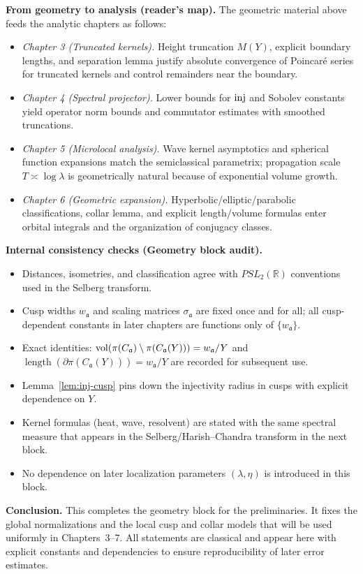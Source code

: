\medskip

\noindent\textbf{From geometry to analysis (reader’s map).}
The geometric material above feeds the analytic chapters as follows:
\begin{itemize}
  \item \emph{Chapter 3 (Truncated kernels).} Height truncation $M(Y)$, explicit boundary lengths, and separation lemma
        justify absolute convergence of Poincaré series for truncated kernels and control remainders near the boundary.
  \item \emph{Chapter 4 (Spectral projector).} Lower bounds for $\operatorname{inj}$ and Sobolev constants yield
        operator norm bounds and commutator estimates with smoothed truncations.
  \item \emph{Chapter 5 (Microlocal analysis).} Wave kernel asymptotics
        and spherical function expansions match the semiclassical parametrix;
        propagation scale $T\asymp \log\lambda$ is geometrically natural because of exponential volume growth.
  \item \emph{Chapter 6 (Geometric expansion).} Hyperbolic/elliptic/parabolic classifications, collar lemma,
        and explicit length/volume formulas enter orbital integrals and the organization of conjugacy classes.
\end{itemize}

\medskip

\noindent\textbf{Internal consistency checks (Geometry block audit).}
\begin{itemize}
  \item Distances, isometries, and classification agree with $PSL_{2}(\mathbb{R})$ conventions used in the Selberg transform.
  \item Cusp widths $w_{\mathfrak{a}}$ and scaling matrices $\sigma_{\mathfrak{a}}$ are fixed once and for all;
        all cusp-dependent constants in later chapters are functions only of $\{w_{\mathfrak{a}}\}$.
  \item Exact identities:
        $\operatorname{vol}(\pi(C_{\mathfrak{a}})\setminus\pi(C_{\mathfrak{a}}(Y)))=w_{\mathfrak{a}}/Y$
        and $\operatorname{length}(\partial \pi(C_{\mathfrak{a}}(Y)))=w_{\mathfrak{a}}/Y$
        are recorded for subsequent use.
  \item Lemma~\ref{lem:inj-cusp} pins down the injectivity radius in cusps with explicit dependence on $Y$.
  \item Kernel formulas (heat, wave, resolvent) are stated with the same spectral measure
        that appears in the Selberg/Harish–Chandra transform in the next block.
  \item No dependence on later localization parameters $(\lambda,\eta)$ is introduced in this block.
\end{itemize}

\medskip

\noindent\textbf{Conclusion.}
This completes the geometry block for the preliminaries.
It fixes the global normalizations and the local cusp and collar models that
will be used uniformly in Chapters~3–7.
All statements are classical and appear here with explicit constants and
dependencies to ensure reproducibility of later error estimates.
